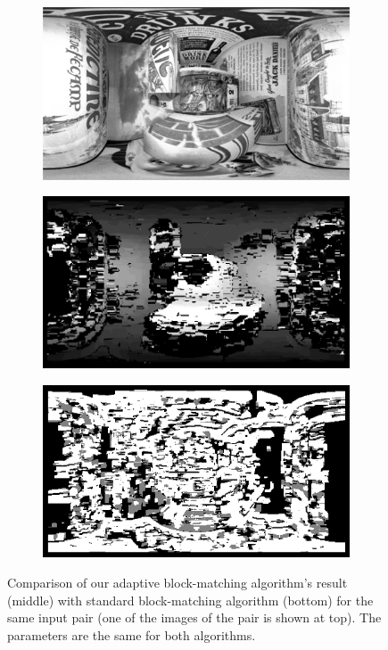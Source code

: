 %
\begin{figure}[h]
\centering
	\begin{subfigure}{0.6\linewidth}
		\centering
		\includegraphics[width=\linewidth]{img/original.png}
	\end{subfigure}
	\begin{subfigure}{0.6\linewidth}
		\centering
		\includegraphics[width=\linewidth]{img/our_disparity.png}
	\end{subfigure}
	\begin{subfigure}{0.6\linewidth}
		\centering
		\includegraphics[width=\linewidth]{img/legacy_disparity.png}
	\end{subfigure}
\caption{Comparison of our adaptive block-matching algorithm's result (middle) with
standard block-matching algorithm (bottom) for the same input pair (one of the
images of the pair is shown at top). The parameters are the same for
both algorithms.}
\label{fig:disparity_comparison}
\end{figure}
%
